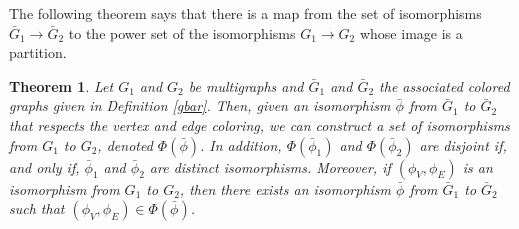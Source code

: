 \documentclass[amsmath,secnumarabic,floatfix,amssymb,nofootinbib,nobibnotes,letterpaper,11pt,tightenlines,showkeys]{revtex4}
\newtheorem{theorem}{Theorem}
\theoremstyle{definition}
\newtheorem{definition}[theorem]{Definition}
\let\mgp=\marginpar \marginparwidth18mm \marginparsep1mm
\def\marginpar#1{\mgp{\raggedright\tiny #1}}
\let\lbl=\label
\def\label#1{\lbl{#1}\ifinner\else\marginpar{\ref{#1} #1}\ignorespaces\fi}
\begin{document}

%	
%

The following theorem says that there is a map from the set of isomorphisms $\bar{G}_1 \rightarrow \bar{G}_2$ to the power set of the isomorphisms $G_1 \rightarrow G_2$ whose image is a partition.

\begin{theorem}
	Let $G_1$ and $G_2$ be multigraphs and $\bar{G}_1$ and $\bar{G}_2$ the associated colored graphs given in Definition \ref{gbar}. Then, given an isomorphism $\bar{\phi}$ from $\bar{G}_1$ to $\bar{G}_2$ that respects the vertex and edge coloring, we can construct a set of isomorphisms  from $G_1$ to $G_2$, denoted $\Phi(\bar{\phi}) $. In addition, $\Phi(\bar{\phi}_1)$ and $\Phi(\bar{\phi}_2) $ are disjoint if, and only if, $\bar{\phi}_1$ and $\bar{\phi}_2$ are distinct isomorphisms. Moreover, if $(\phi_V,\phi_E)$ is an isomorphism from $G_1$ to $G_2$, then there exists an isomorphism $\bar{\phi}$ from $\bar{G}_1$ to $\bar{G}_2$ such that $(\phi_V,\phi_E) \in \Phi(\bar{\phi})$. 
\end{theorem}

\end{document}
